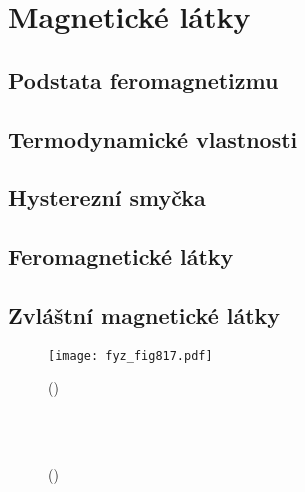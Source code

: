 \setchaptertoc
\chapter{Magnetické látky}\label{fyz:IIchapXXXVII}

  \section{Podstata feromagnetizmu}\label{fyz:IIchapXXXVIIsecI}
  \section{Termodynamické vlastnosti}\label{fyz:IIchapXXXVIIsecII}
  \section{Hysterezní smyčka}\label{fyz:IIchapXXXVIIsecIII}
  \section{Feromagnetické látky}\label{fyz:IIchapXXXVIIsecIV}
  \section{Zvláštní magnetické látky}\label{fyz:IIchapXXXVIIsecV}

    \begin{figure}[ht!] %
      \centering
      \texttt{[image: fyz\_fig817.pdf]}
      \caption{
               (\cite[s.~707]{Feynman02})}
      \label{fyz:fig817}
    \end{figure}

    \begin{figure}[ht!]
      \centering
                     \\
                     \\
      \caption{
               (\cite[s.~748]{Feynman02})}
      \label{fyz:fig818}
    \end{figure}

